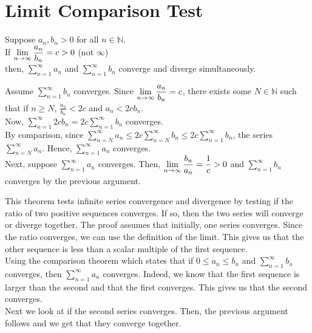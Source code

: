 \documentclass[12pt]{article}
\begin{document}
\section{Limit Comparison Test}
\begin{theo}{}
Suppose \(a_n, b_n > 0\) for all \(n \in \mathbb N\).\\
If \(\displaystyle\lim_{n\to\infty}\frac{a_n}{b_n} = c > 0\) (not \(\infty\))\\
then, \(\displaystyle\sum_{n=1}^\infty a_n\) and \(\displaystyle\sum_{n=1}^\infty b_n\) converge and diverge simultaneously.    
\end{theo}
\begin{prf}{}
Assume \(\displaystyle\sum_{n=1}^\infty b_n\) converges. Since \(\displaystyle\lim_{n\to\infty}\frac{a_n}{b_n} = c\), there exists some \(N \in \mathbb N\) such that if \(n \ge N\),  \(\frac{a_n}{b_n} < 2c\) and \(a_n < 2cb_n\).\\
Now, \(\displaystyle\sum_{n=1}^\infty 2cb_n = 2c\displaystyle\sum_{n=1}^\infty b_n\) converges.\\
By comparison, since \(\displaystyle\sum_{n=N}^\infty a_n \le 2c\displaystyle\sum_{n=N}^\infty b_n \le 2c\displaystyle\sum_{n=1}^\infty b_n\), the series \(\displaystyle\sum_{n=N}^\infty a_n\). Hence, \(\displaystyle\sum_{n=1}^\infty a_n\) converges.\\
Next, suppose \(\displaystyle\sum_{n=1}^\infty a_n\) converges. Then, \(\displaystyle\lim_{n\to\infty}\frac{b_n}{a_n} = \frac{1}{c} > 0\) and \(\displaystyle\sum_{n=1}^\infty b_n\) converges by the previous argument.
\end{prf}
\newpage
\begin{explanation}{}
    This theorem tests infinite series convergence and divergence by testing if the ratio of two positive sequences converges. If so, then the two series will converge or diverge together. The proof assumes that initially, one series converges. Since the ratio converges, we can use the definition of the limit. This gives us that the other sequence is less than a scalar multiple of the first sequence.\\
Using the comparison theorem which states that if $0 \le a_n \le b_n$ and $\displaystyle\sum_{n=1}^\infty b_n$ converges, then $\displaystyle\sum_{n=1}^\infty a_n$ converges. Indeed, we know that the first sequence is larger than the second and that the first converges. This gives us that the second converges.\\
Next we look at if the second series converges. Then, the previous argument follows and we get that they converge together.\\
\end{explanation}
\end{document}
